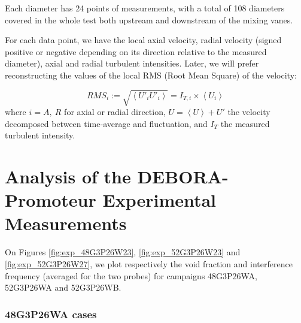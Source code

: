 \npar



Each diameter has 24 points of measurements, with a total of 108 diameters covered in the whole test both upstream and downstream of the mixing vanes. 

\npar

For each data point, we have the local axial velocity, radial velocity (signed positive or negative depending on its direction relative to the measured diameter), axial and radial turbulent intensities. Later, we will prefer reconstructing the values of the local RMS (Root Mean Square) of the velocity:

\begin{equation}
RMS_{i} := \sqrt{\left<U'_{i}U'_{i}\right>} = I_{T,i} \times \left<U_{i}\right>
\label{eq:RMS_def}
\end{equation}
where $i=A,\ R$ for axial or radial direction, $U=\left<U\right> + U'$ the velocity decomposed between time-average and fluctuation, and $I_{T}$ the measured turbulent intensity. 




\section{Analysis of the DEBORA-Promoteur Experimental Measurements}
\label{sec:deb_prom_anal}

On Figures \ref{fig:exp_48G3P26W23}, \ref{fig:exp_52G3P26W23} and \ref{fig:exp_52G3P26W27}, we plot respectively the void fraction and interference frequency (averaged for the two probes) for campaigns 48G3P26WA, 52G3P26WA and 52G3P26WB.



\subsubsection{48G3P26WA cases}


